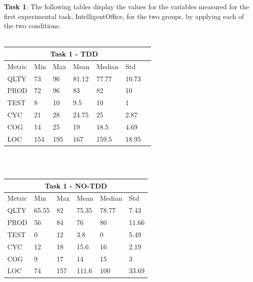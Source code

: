\noindent\textbf{Task 1}: The following tables display the values for the variables measured for the first experimental task, IntelligentOffice, for the two groups, by applying each of the two conditions.
\\ \  \\
\noindent
\begin{tabular}{ |p{2cm}||p{1.6cm}|p{1.6cm}|p{1.6cm}|p{1.6cm}|p{1.6cm}|p{1.6cm}| }
    \hline
        \multicolumn{6}{|c|}{Task 1 - TDD} \\
    \hline
        Metric & Min & Max & Mean & Median & Std \\
    \hline
        QLTY & 73 & 96 & 81.12 & 77.77 & 10.73 \\
        PROD & 72 & 96 & 83 & 82 & 10 \\
        TEST & 8 & 10 & 9.5 & 10 & 1 \\
        CYC & 21 & 28 & 24.75 & 25 & 2.87 \\
        COG & 14 & 25 & 19 & 18.5 & 4.69 \\
        LOC & 154 & 195 & 167 & 159.5 & 18.95 \\
    \hline
\end{tabular}
\\ \  \\
\noindent
\begin{tabular}{ |p{2cm}||p{1.6cm}|p{1.6cm}|p{1.6cm}|p{1.6cm}|p{1.6cm}|}
    \hline
        \multicolumn{6}{|c|}{Task 1 - NO-TDD} \\
    \hline
        Metric & Min & Max & Mean & Median & Std\\
    \hline
        QLTY & 65.55 & 82 & 75.35 & 78.77 & 7.43 \\
        PROD & 56 & 84 & 76 & 80 & 11.66 \\
        TEST & 0 & 12 & 3.8 & 0 & 5.49 \\
        CYC & 12 & 18 & 15.6 & 16 & 2.19 \\
        COG & 9 & 17 & 14 & 15 & 3 \\
        LOC & 74 & 157 & 111.6 & 100 & 33.69 \\
    \hline
\end{tabular}
\\ \  \\
